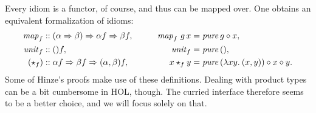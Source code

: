 Every idiom is a functor, of course, and thus can be mapped over.
One obtains an equivalent formalization of idioms:
\begin{alignat*}{2}
	\mathit{map}_f &\mathrel{::} (\alpha \Rightarrow \beta) \Rightarrow \alpha f \Rightarrow \beta f, &\qquad
		\operatorname{\mathit{map}}_f\,g\,x &= \operatorname{\mathit{pure}} g \diamond x, \\
	\mathit{unit}_f &\mathrel{::} () f, &\qquad \mathit{unit}_f &= \operatorname{\mathit{pure}}{()}, \\
	(\star_f) &\mathrel{::} \alpha f \Rightarrow \beta f \Rightarrow (\alpha, \beta) f, &\qquad
		x \star_f y &= \operatorname{\mathit{pure}}{(\lambda x y.\>(x,y))} \diamond x \diamond y.
\end{alignat*}
Some of Hinze's proofs make use of these definitions.
Dealing with product types can be a bit cumbersome in HOL, though.
The curried interface therefore seems to be a better choice, and we will
focus solely on that.

